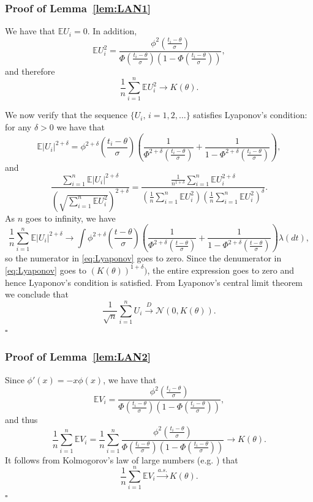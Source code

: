 \documentclass[letterpaper, conference]{IEEEtran}      %
\newcommand*{\QEDA}{\hfill\ensuremath{\square}}
\begin{document}
\subsubsection*{Proof of Lemma~\ref{lem:LAN1}} 
We have that $\mathbb E  U_i= 0$. In addition,
\[
\mathbb E U_i^2 = \frac{ \phi^2 \left( \frac{t_i-\theta}{\sigma} \right) } { \Phi \left( \frac{t_i-\theta}{\sigma} \right) \left(1- \Phi \left( \frac{t_i-\theta}{\sigma} \right) \right)},
\]
and therefore
\[
\frac{1}{n} \sum_{i=1}^n \mathbb E U_i^2 \rightarrow K(\theta).
\]

We now verify that the sequence $\{ U_i,\,i=1,2,\ldots \}$ satisfies Lyaponov's condition: for any $\delta>0$ we have that 
\[
\mathbb E \left| U_i \right|^{2+\delta} = \phi^{2+\delta} \left(\frac{t_i-\theta} {\sigma } \right)   \left( \frac{1}{\Phi^{2+\delta} \left(\frac{t_i-\theta}{\sigma }\right)} + \frac{1}{1-\Phi^{2+\delta} \left(\frac{t_i-\theta}{\sigma }\right)} \right),
\]
and
\begin{equation}
\frac{\sum_{i=1}^n \mathbb E \left| U_i \right|^{2+\delta} }{ \left( \sqrt{\sum_{i=1}^n \mathbb E U_i^2 } \right)^{2+\delta}} = 
\frac{ \frac{1}{n^{1+\delta}} \sum_{i=1}^n \mathbb E U_i^{2+\delta} }{ \left(\frac{1}{n} \sum_{i=1}^n \mathbb E U_i^2  \right) \left(\frac{1}{n} \sum_{i=1}^n \mathbb E U_i^2  \right)^\delta}. 
\label{eq:Lyaponov}
\end{equation}
As $n$ goes to infinity, we have
\[
\frac{1}{n}\sum_{i=1}^n \mathbb E \left| U_i \right|^{2+\delta}  \rightarrow  \int \phi^{2+\delta} \left(\frac{t-\theta}{\sigma }\right) \left( \frac{1}{\Phi^{2+\delta}\left(\frac{t-\theta}{\sigma }\right)} + \frac{1}{1-\Phi^{2+\delta} \left(\frac{t-\theta}{\sigma }\right)} \right) \lambda(dt),
\]
so the numerator in \eqref{eq:Lyaponov} goes to zero. Since the denumerator in \eqref{eq:Lyaponov} goes to $(K(\theta))^{1+\delta})$, the entire expression goes to zero and hence Lyaponov's condition is satisfied. From Lyaponov's central limit theorem we conclude that 
\[
\frac{1}{\sqrt{n}} \sum_{i=1}^n U_i \overset{D}{\rightarrow} \mathcal N\left(0,K(\theta) \right). 
\]
\QEDA

\subsubsection*{Proof of Lemma~\ref{lem:LAN2}} 

Since $\phi'(x) = -x \phi(x)$, we have that
\[
\mathbb E V_i =  \frac{\phi^2 \left(\frac{ t_i-\theta}{\sigma} \right) } { \Phi \left(\frac{ t_i-\theta}{\sigma} \right)  \left(1-\Phi \left(\frac{ t_i-\theta}{\sigma} \right)  \right)},
\]
and thus
\[
\frac{1}{n} \sum_{i=1}^n \mathbb E V_i =  \frac{1}{n} \sum_{i=1}^n  \frac{\phi^2\left( \frac{t_i-\theta}{\sigma} \right)} { \Phi \left( \frac{t_i - \theta}{\sigma} \right)\left(1-\Phi \left( \frac{t_i - \theta}{\sigma} \right) \right)} \rightarrow K(\theta).  
\]
It follows from Kolmogorov's law of large numbers (e.g. \cite[Thm. 10.2.3]{sen1994large}) that
\[
\frac{1}{n} \sum_{i=1}^n \mathbb E V_i \overset{a.s.}{\rightarrow} K(\theta). 
\]
\QEDA
\end{document}

